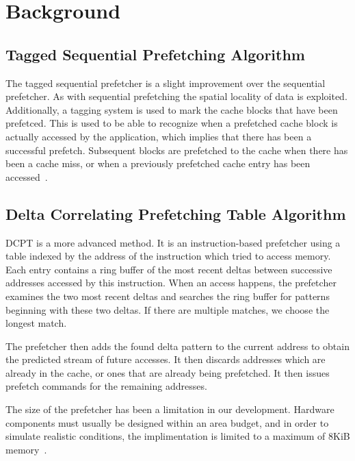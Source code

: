 \section{Background}

\subsection{Tagged Sequential Prefetching Algorithm}

The tagged sequential prefetcher is a slight improvement over the sequential
prefetcher. As with sequential prefetching the spatial locality of data is
exploited. Additionally, a tagging system is used to mark the cache blocks that
have been prefetced. This is used to be able to recognize when a prefetched
cache block is actually accessed by the application, which implies that there
has been a successful prefetch. Subsequent blocks are prefetched to the cache
when there has been a cache miss, or when a previously prefetched cache entry
has been accessed~\cite{grannaes}.

\subsection{Delta Correlating Prefetching Table Algorithm}

DCPT is a more advanced method. It is an instruction-based prefetcher using a
table indexed by the address of the instruction which tried to access memory.
Each entry contains a ring buffer of the most recent deltas between successive
addresses accessed by this instruction. When an access happens, the prefetcher
examines the two most recent deltas and searches the ring buffer for patterns
beginning with these two deltas. If there are multiple matches, we choose the
longest match.

The prefetcher then adds the found delta pattern to the current address to
obtain the predicted stream of future accesses. It then discards addresses which
are already in the cache, or ones that are already being prefetched. It then
issues prefetch commands for the remaining addresses.


The size of the prefetcher has been a limitation in our development. Hardware
components must usually be designed within an area budget, and in order to
simulate realistic conditions, the implimentation is limited to a maximum of
8KiB memory~\cite{guidelines}.

